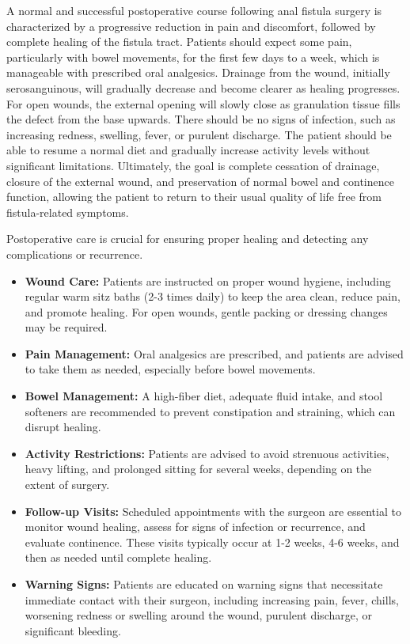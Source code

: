 A normal and successful postoperative course following anal fistula surgery is characterized by a progressive reduction in pain and discomfort, followed by complete healing of the fistula tract. Patients should expect some pain, particularly with bowel movements, for the first few days to a week, which is manageable with prescribed oral analgesics. Drainage from the wound, initially serosanguinous, will gradually decrease and become clearer as healing progresses. For open wounds, the external opening will slowly close as granulation tissue fills the defect from the base upwards. There should be no signs of infection, such as increasing redness, swelling, fever, or purulent discharge. The patient should be able to resume a normal diet and gradually increase activity levels without significant limitations. Ultimately, the goal is complete cessation of drainage, closure of the external wound, and preservation of normal bowel and continence function, allowing the patient to return to their usual quality of life free from fistula-related symptoms.

Postoperative care is crucial for ensuring proper healing and detecting any complications or recurrence.

\begin{itemize}
  \item \textbf{Wound Care:} Patients are instructed on proper wound hygiene, including regular warm sitz baths (2-3 times daily) to keep the area clean, reduce pain, and promote healing. For open wounds, gentle packing or dressing changes may be required.
  \item \textbf{Pain Management:} Oral analgesics are prescribed, and patients are advised to take them as needed, especially before bowel movements.
  \item \textbf{Bowel Management:} A high-fiber diet, adequate fluid intake, and stool softeners are recommended to prevent constipation and straining, which can disrupt healing.
  \item \textbf{Activity Restrictions:} Patients are advised to avoid strenuous activities, heavy lifting, and prolonged sitting for several weeks, depending on the extent of surgery.
  \item \textbf{Follow-up Visits:} Scheduled appointments with the surgeon are essential to monitor wound healing, assess for signs of infection or recurrence, and evaluate continence. These visits typically occur at 1-2 weeks, 4-6 weeks, and then as needed until complete healing.
  \item \textbf{Warning Signs:} Patients are educated on warning signs that necessitate immediate contact with their surgeon, including increasing pain, fever, chills, worsening redness or swelling around the wound, purulent discharge, or significant bleeding.
\end{itemize}

